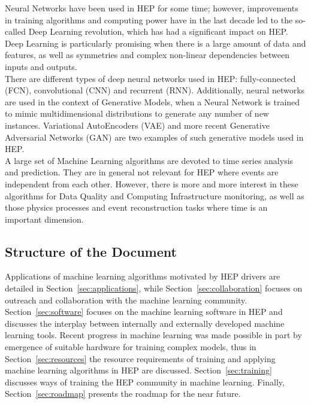 Neural Networks have been used in HEP for some time; however, improvements in training algorithms and computing power have in the last decade led to the so-called Deep Learning
revolution, which has had a significant impact on HEP. Deep Learning is particularly promising when there is a large amount of data and features, as well as symmetries and complex non-linear dependencies between inputs and outputs.\\

There are different types of deep neural networks used in HEP: fully-connected (FCN), convolutional (CNN) and recurrent (RNN). Additionally, neural networks are used in the context of Generative Models, when a Neural Network is trained to mimic multidimensional distributions to generate any number of new instances. Variational AutoEncoders (VAE) and more recent Generative Adversarial Networks (GAN) are two examples of such generative models used in HEP.\\

A large set of Machine Learning algorithms are devoted to time series analysis and prediction. They are in general not relevant for HEP where events are independent from each other. However, there is more and more interest in these algorithms for Data Quality and Computing Infrastructure monitoring, as well as those physics processes and event reconstruction tasks where time is an important dimension.


\subsection{Structure of the Document}


Applications of machine learning algorithms motivated by HEP drivers are detailed in Section~\ref{sec:applications}, while Section~\ref{sec:collaboration} focuses on outreach and collaboration with the machine learning community. Section~\ref{sec:software} focuses on the machine learning software in HEP and discusses the interplay between internally and externally developed machine learning tools. Recent progress in machine learning was made possible in part by emergence of suitable hardware for training complex models, thus in Section~\ref{sec:resources} the resource requirements of training and applying machine learning algorithms in HEP are discussed. Section~\ref{sec:training} discusses ways of training the HEP community in machine learning.  Finally, Section~\ref{sec:roadmap} presents the roadmap for the near future.


